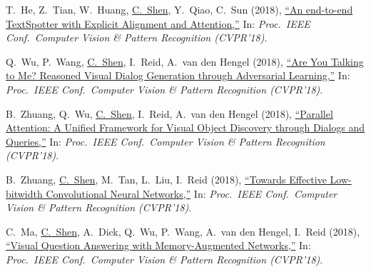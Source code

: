\documentclass[9pt, a4paper]{article}
\newcommand{\years}[1]{\marginnote{\scriptsize #1}}
\def\highlight{\uline}
\begin{document}
\medskip

\years{2018} T.~He, Z.~Tian, W.~Huang, \highlight{C.~Shen}, Y.~Qiao, C.~Sun (2018),
\href{http://www.google.com/search?lr=&ie=UTF-8&oe=UTF-8&q=An+end-to-end+TextSpotter+with+Explicit+Alignment+and+Attention+Tong+He%2C+Zhi+Tian%2C+Weilin+Huang%2C+Chunhua+Shen%2C+Yu+Qiao%2C+Changming+Sun}{``An end-to-end TextSpotter with Explicit Alignment and Attention,{}''}
In: \emph{Proc.\ IEEE Conf.\  Computer Vision \& Pattern Recognition (CVPR'18)}.

\medskip

\years{2018} Q.~Wu, P.~Wang, \highlight{C.~Shen}, I.~Reid, A.~van den Hengel (2018),
\href{http://www.google.com/search?lr=&ie=UTF-8&oe=UTF-8&q=Are+You+Talking+to+Me%3F+Reasoned+Visual+Dialog+Generation+through+Adversarial+Learning+Qi+Wu%2C+Peng+Wang%2C+Chunhua+Shen%2C+Ian+Reid%2C+Anton+van+den+Hengel}{``Are You Talking to Me? Reasoned Visual Dialog Generation through Adversarial Learning,{}''}
In: \emph{Proc.\ IEEE Conf.\  Computer Vision \& Pattern Recognition (CVPR'18)}.

\medskip

\years{2018} B.~Zhuang, Q.~Wu, \highlight{C.~Shen}, I.~Reid, A.~van den Hengel (2018),
\href{http://www.google.com/search?lr=&ie=UTF-8&oe=UTF-8&q=Parallel+Attention%3A+A+Unified+Framework+for+Visual+Object+Discovery+through+Dialogs+and+Queries+Bohan+Zhuang%2C+Qi+Wu%2C+Chunhua+Shen%2C+Ian+Reid%2C+Anton+van+den+Hengel}{``Parallel Attention: A Unified Framework for Visual Object Discovery through Dialogs and Queries,{}''}
In: \emph{Proc.\ IEEE Conf.\  Computer Vision \& Pattern Recognition (CVPR'18)}.

\medskip

\years{2018} B.~Zhuang, \highlight{C.~Shen}, M.~Tan, L.~Liu, I.~Reid (2018),
\href{http://www.google.com/search?lr=&ie=UTF-8&oe=UTF-8&q=Towards+Effective+Low-bitwidth+Convolutional+Neural+Networks+Bohan+Zhuang%2C+Chunhua+Shen%2C+Mingkui+Tan%2C+Lingqiao+Liu%2C+Ian+Reid}{``Towards Effective Low-bitwidth Convolutional Neural Networks,{}''}
In: \emph{Proc.\ IEEE Conf.\  Computer Vision \& Pattern Recognition (CVPR'18)}.

\medskip

\years{2018} C.~Ma, \highlight{C.~Shen}, A.~Dick, Q.~Wu, P.~Wang, A.~van den Hengel, I.~Reid (2018),
\href{http://www.google.com/search?lr=&ie=UTF-8&oe=UTF-8&q=Visual+Question+Answering+with+Memory-Augmented+Networks+Chao+Ma%2C+Chunhua+Shen%2C+Anthony+Dick%2C+Qi+Wu%2C+Peng+Wang%2C+Anton+van+den+Hengel%2C+Ian+Reid}{``Visual Question Answering with Memory-Augmented Networks,{}''}
In: \emph{Proc.\ IEEE Conf.\  Computer Vision \& Pattern Recognition (CVPR'18)}.
\end{document}
